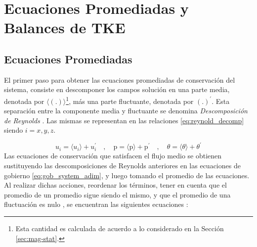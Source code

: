 \chapter{Ecuaciones Promediadas y Balances de TKE } \label{apen:budgets}


\section{Ecuaciones Promediadas}


El primer paso para obtener las ecuaciones promediadas de conservación del sistema, consiste en descomponer los campos solución en una parte media, denotada por $\langle (\text{.}) \rangle$\footnote{Esta cantidad es calculada de acuerdo a lo considerado en la Sección \ref{sec:mag-stat}.}, más una parte fluctuante, denotada por $(\text{.})^{\prime}$. Esta separación entre la componente media y fluctuante se denomina \textit{Descomposición de Reynolds} \cite{kundu,pope2001turbulent}. Las mismas se representan en las relaciones \ref{eq:reynold_decomp} siendo $i=x,y,z$. 

\begin{equation}
u_i = \langle u_i \rangle + u^{\prime}_i \quad , \quad \text{p} = \langle \text{p} \rangle + \text{p}^{\prime} \quad , \quad \theta = \langle \theta \rangle + \theta^{\prime}
\label{eq:reynold_decomp}
\end{equation}
Las ecuaciones de conservación que satisfacen el flujo medio se obtienen sustituyendo las descomposiciones de Reynolds anteriores en las ecuaciones de gobierno \ref{eq:gob_system_adim}, y luego tomando el promedio de las ecuaciones. Al realizar dichas acciones, reordenar los términos, tener en cuenta que el promedio de un promedio sigue siendo el mismo, y que el promedio de una fluctuación es nulo \cite{pope2001turbulent}, se encuentran las siguientes ecuaciones \cite{kundu}:


